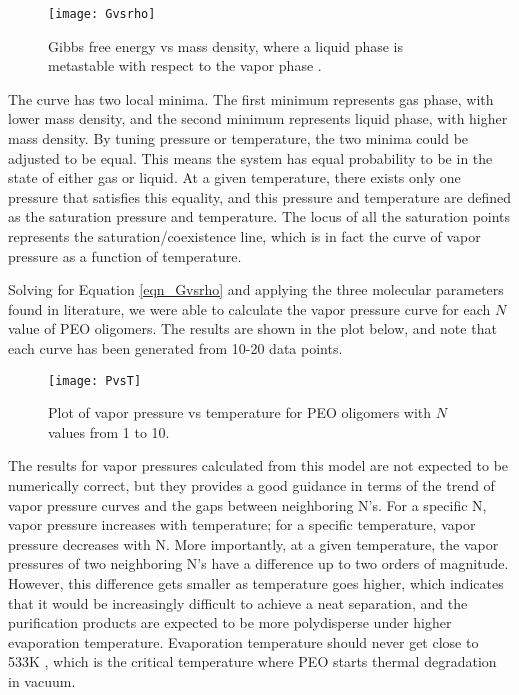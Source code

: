 \begin{figure}[H]
\center
\texttt{[image: Gvsrho]}
\caption[Gibbs free energy vs mass density, where a liquid phase is metastable with respect to the vapor phase]{Gibbs free energy vs mass density, where a liquid phase is metastable with respect to the vapor phase \cite{Sanchez1976}.}
\label{fig:Gvsrho}
\end{figure}

The curve has two local minima. The first minimum represents gas phase, with lower mass density, and the second minimum represents liquid phase, with higher mass density. By tuning pressure or temperature, the two minima could be adjusted to be equal. This means the system has equal probability to be in the state of either gas or liquid. At a given temperature, there exists only one pressure that satisfies this equality, and this pressure and temperature are defined as the saturation pressure and temperature. The locus of all the saturation points represents the saturation/coexistence line, which is in fact the curve of vapor pressure as a function of temperature.

Solving for Equation \ref{eqn_Gvsrho} and applying the three molecular parameters found in literature, we were able to calculate the vapor pressure curve for each $N$ value of PEO oligomers. The results are shown in the plot below, and note that each curve has been generated from 10-20 data points.

\begin{figure}[H]
\center
\texttt{[image: PvsT]}
\caption{Plot of vapor pressure vs temperature for PEO oligomers with $N$ values from 1 to 10.}
\label{fig:VPvsT}
\end{figure}

The results for vapor pressures calculated from this model are not expected to be numerically correct, but they provides a good guidance in terms of the trend of vapor pressure curves and the gaps between neighboring N's. For a specific N, vapor pressure increases with temperature; for a specific temperature, vapor pressure decreases with N. More importantly, at a given temperature, the vapor pressures of two neighboring N's have a difference up to two orders of magnitude. However, this difference gets smaller as temperature goes higher, which indicates that it would be increasingly difficult to achieve a neat separation, and the purification products are expected to be more polydisperse under higher evaporation temperature. Evaporation temperature should never get close to 533K \cite{Choukourov2009}, which is the critical temperature where PEO starts thermal degradation in vacuum.

